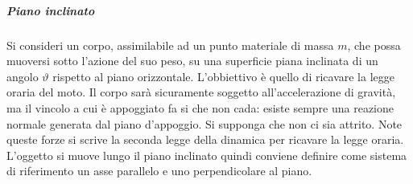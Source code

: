 \documentclass[10pt,a4paper]{book}
\begin{document}
\subparagraph{Piano inclinato} Si consideri un corpo, assimilabile ad un punto materiale di massa $m$, che possa muoversi sotto l'azione del suo peso, su una superficie piana inclinata di un angolo $\vartheta$ rispetto al piano orizzontale. L'obbiettivo è quello di ricavare la legge oraria del moto. Il corpo sarà sicuramente soggetto all'accelerazione di gravità, ma il vincolo a cui è appoggiato fa si che non cada: esiste sempre una reazione normale generata dal piano d'appoggio. Si supponga che non ci sia attrito. Note queste forze si scrive la seconda legge della dinamica per ricavare la legge oraria. L'oggetto si muove lungo il piano inclinato quindi conviene definire come sistema di riferimento un asse parallelo e uno perpendicolare al piano.
\begin{figure}[htpb]
	\centering
	


	\begin{tikzpicture}[x=0.75pt,y=0.75pt,yscale=-1,xscale=1]


\end{tikzpicture}
\end{figure}
\end{document}
